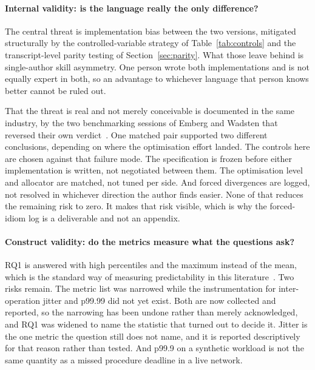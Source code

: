 \documentclass[english,oneside,a4paper,censored,csm,software-track-2020]{HYthesisML}
\begin{document}
\paragraph{Internal validity: is the language really the only difference?}
The central threat is implementation bias between the two versions, mitigated structurally by the
controlled-variable strategy of Table~\ref{tab:controls} and the transcript-level parity testing
of Section~\ref{sec:parity}. What those leave behind is single-author skill asymmetry. One person
wrote both implementations and is not equally expert in both, so an advantage to whichever
language that person knows better cannot be ruled out.

That the threat is real and not merely conceivable is documented in the same industry, by the two
benchmarking sessions of Emberg and Wadsten that reversed their own
verdict~\cite{emberg2023asn1}. One matched pair supported two different conclusions, depending on
where the optimisation effort landed. The controls here are chosen against that failure
mode. The specification is frozen before either implementation is written, not negotiated
between them. The optimisation level and allocator are matched, not tuned per side. And
forced divergences are logged, not resolved in whichever direction the author finds easier.
None of that reduces the remaining risk to zero. It makes that risk visible, which is why the
forced-idiom log is a deliverable and not an appendix.

\paragraph{Construct validity: do the metrics measure what the questions ask?}
RQ1 is answered with high percentiles and the maximum instead of the mean, which is the standard
way of measuring predictability in this literature~\cite{dean2013tail}. Two risks remain. The metric
list was narrowed while the instrumentation for inter-operation jitter and p99.99 did not yet exist.
Both are now collected and reported, so the narrowing has been undone rather than merely
acknowledged, and RQ1 was widened to name the statistic that turned out to decide it. Jitter is the
one metric the question still does not name, and it is reported descriptively for that reason rather
than tested. And p99.9 on a synthetic workload is not the same quantity as a missed procedure
deadline in a live network.
\end{document}
